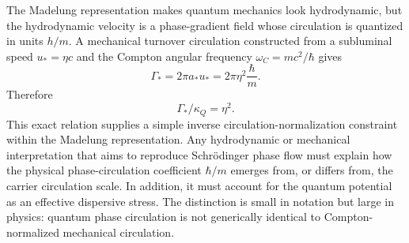 \documentclass[11pt,a4paper]{article}
\begin{document}
The Madelung representation makes quantum mechanics look hydrodynamic, but the hydrodynamic velocity is a phase-gradient field whose circulation is quantized in units $h/m$. A mechanical turnover circulation constructed from a subluminal speed $u_* = \eta c$ and the Compton angular frequency $\omega_C=mc^2/\hbar$ gives
\begin{equation}
    \Gamma_* = 2\pi a_*u_* = 2\pi\eta^2\frac{\hbar}{m}.
\end{equation}
Therefore
\begin{equation}
    \boxed{\Gamma_*/\kappa_Q=\eta^2.}
\end{equation}
This exact relation supplies a simple inverse circulation-normalization constraint within the Madelung representation. Any hydrodynamic or mechanical interpretation that aims to reproduce Schr\"odinger phase flow must explain how the physical phase-circulation coefficient $\hbar/m$ emerges from, or differs from, the carrier circulation scale. In addition, it must account for the quantum potential as an effective dispersive stress. The distinction is small in notation but large in physics: quantum phase circulation is not generically identical to Compton-normalized mechanical circulation.
\end{document}
